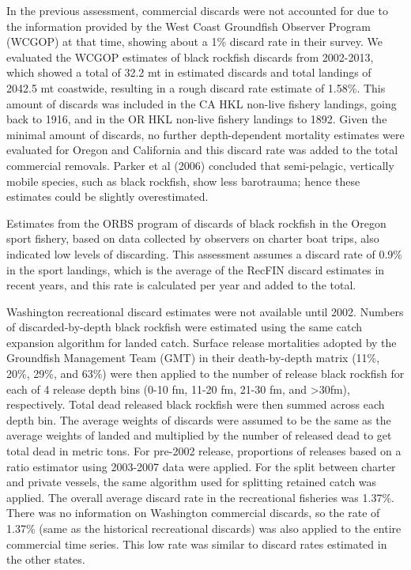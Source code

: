 \documentclass[11pt,
  english,
  letterpaper,
]{article}
\begin{document}
In the previous assessment, commercial discards were not accounted for due to the information provided by the West Coast Groundfish Observer Program (WCGOP) at that time, showing about a 1\% discard rate in their survey. We evaluated the WCGOP estimates of black rockfish discards from 2002-2013, which showed a total of 32.2 mt in estimated discards and total landings of 2042.5 mt coastwide, resulting in a rough discard rate estimate of 1.58\%. This amount of discards was included in the CA HKL non-live fishery landings, going back to 1916, and in the OR HKL non-live fishery landings to 1892. Given the minimal amount of discards, no further depth-dependent mortality estimates were evaluated for Oregon and California and this discard rate was added to the total commercial removals. Parker et al (2006) concluded that semi-pelagic, vertically mobile species, such as black rockfish, show less barotrauma; hence these estimates could be slightly overestimated.

Estimates from the ORBS program of discards of black rockfish in the Oregon sport fishery, based on data collected by observers on charter boat trips, also indicated low levels of discarding. This assessment assumes a discard rate of 0.9\% in the sport landings, which is the average of the RecFIN discard estimates in recent years, and this rate is calculated per year and added to the total.

Washington recreational discard estimates were not available until 2002. Numbers of discarded-by-depth black rockfish were estimated using the same catch expansion algorithm for landed catch. Surface release mortalities adopted by the Groundfish Management Team (GMT) in their death-by-depth matrix (11\%, 20\%, 29\%, and 63\%) were then applied to the number of release black rockfish for each of 4 release depth bins (0-10 fm, 11-20 fm, 21-30 fm, and \textgreater30fm), respectively. Total dead released black rockfish were then summed across each depth bin. The average weights of discards were assumed to be the same as the average weights of landed and multiplied by the number of released dead to get total dead in metric tons. For pre-2002 release, proportions of releases based on a ratio estimator using 2003-2007 data were applied. For the split between charter and private vessels, the same algorithm used for splitting retained catch was applied. The overall average discard rate in the recreational fisheries was 1.37\%. There was no information on Washington commercial discards, so the rate of 1.37\% (same as the historical recreational discards) was also applied to the entire commercial time series. This low rate was similar to discard rates estimated in the other states.
\end{document}
